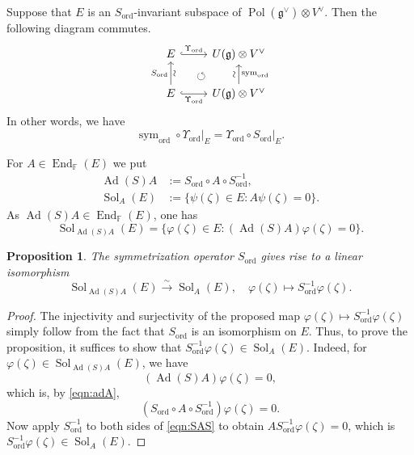 \documentclass[a4paper,11pt,reqno]{amsart}
\newcommand{\frakg}{\mathfrak{g}}
\newcommand{\0}{{\bf 0}}
\newcommand{\F}{\mathbb{F}}
\newcommand{\1}{{\bf 1}}
\DeclareMathOperator{\Ad}{Ad}
\DeclareMathOperator{\End}{End}
\DeclareMathOperator{\Pol}{Pol}
\newcommand{\ord}{{\mathrm{ord}}}
\DeclareMathOperator{\Sol}{Sol}
\DeclareMathOperator{\To}{\longrightarrow}
\DeclareMathOperator{\sym}{sym}
\theoremstyle{plain}
\newtheorem{proposition}[equation]{Proposition}
\theoremstyle{definition}
\numberwithin{equation}{section}
\theoremstyle{definition}
\begin{document}
Suppose that $E$ is an
$S_\ord$-invariant
subspace of $\Pol(\frakg^\vee)\otimes V^\vee$.
Then the following diagram commutes.
\begin{equation}\label{eqn:RS}
\begin{tikzcd}
	{E}& {U(\frakg)\otimes V^\vee}
	\arrow[dl, pos=0.5, phantom, "\circlearrowleft"] \\
	{E} & {U(\frakg)\otimes V^\vee}
	\arrow["{\Upsilon_{\ord}}", hook, from=1-1, to=1-2]
	\arrow["{S_\ord}", "\sim"' sloped,  from=2-1, to=1-1]
	\arrow["\sim" sloped, "\sym_{\ord}"',  from=2-2, to=1-2]
	\arrow["{\Upsilon_{\ord}}"', hook, from=2-1, to=2-2]
\end{tikzcd}
\end{equation}
In other words, we have 
\begin{equation*}
\sym_{\ord} \circ \Upsilon_{\ord}\vert_{E} = \Upsilon_{\ord} 
\circ S_\ord\vert_{E}.
\end{equation*}

For $A \in \End_\F(E)$ we put
\begin{align}
\Ad(S)A&:= S_\ord\circ A \circ S_\ord^{-1}, \label{eqn:adA}\\
\Sol_A(E)&:=\{\psi(\zeta) \in E : A \psi(\zeta)=0\}.\nonumber
\end{align}
As $\Ad(S)A \in \End_\F(E)$, one has
\begin{equation*}
 \Sol_{\Ad(S)A}(E)
=\{\varphi(\zeta) \in E : (\Ad(S)A)\varphi(\zeta)=0\}.
\end{equation*}

\begin{proposition}\label{prop:SolA}
The symmetrization operator $S_\ord$ 
gives rise to a linear isomorphism
\begin{equation*}
 \Sol_{\Ad(S)A}(E)
 \stackrel{\sim}{\To} 
 \Sol_A(E),
\quad
\varphi(\zeta) \longmapsto S_\ord^{-1}\varphi(\zeta).
\end{equation*}
\end{proposition}

\begin{proof}
The injectivity and surjectivity of the proposed map
$\varphi(\zeta) \mapsto S_\ord^{-1}\varphi(\zeta)$ simply follow from  
the fact that $S_\ord$ is an isomorphism on $E$. 
Thus, to prove the proposition, 
it suffices to show that $S_\ord^{-1}\varphi(\zeta) \in \Sol_A(E)$.
Indeed, 
for $\varphi(\zeta) \in  \Sol_{\Ad(S)A}(E)$, we have
\begin{equation*}
(\Ad(S)A) \varphi(\zeta)=0,
\end{equation*}
which is, by \eqref{eqn:adA}, 
\begin{equation}\label{eqn:SAS}
(S_\ord \circ A \circ S_\ord^{-1}) \varphi(\zeta)=0.
\end{equation}
Now apply $S_\ord^{-1}$ to both sides of \eqref{eqn:SAS} 
to obtain $AS_\ord^{-1}\varphi(\zeta) = 0$, 
which is $S_\ord^{-1}\varphi(\zeta) \in \Sol_A(E)$.
\end{proof}
\end{document}
